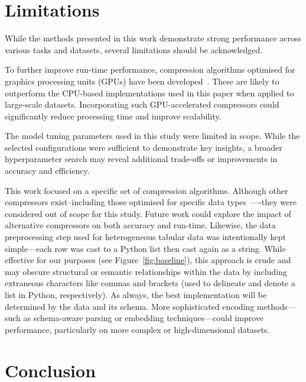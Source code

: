 \documentclass[preprint,12pt]{article}
\begin{document}
\section{Limitations}
\label{limitations}
While the methods presented in this work demonstrate strong performance across various tasks and datasets, several limitations should be acknowledged.

To further improve run-time performance, compression algorithms optimised for graphics processing units (GPUs) have been developed~\cite{gpu_compression}. 
These are likely to outperform the CPU-based implementations used in this paper when applied to large-scale datasets. 
Incorporating such GPU-accelerated compressors could significantly reduce processing time and improve scalability.

The model tuning parameters used in this study were limited in scope. 
While the selected configurations were sufficient to demonstrate key insights, a broader hyperparameter search may reveal additional trade-offs or improvements in accuracy and efficiency.

This work focused on a specific set of compression algorithms. 
Although other compressors exist--including those optimised for specific data types~\cite{gpu_compression,mp3,hevc}—-they were considered out of scope for this study. 
Future work could explore the impact of alternative compressors on both accuracy and run-time.
Likewise, the data preprocessing step used for heterogeneous tabular data was intentionally kept simple---each row was cast to a Python list then cast again as a string. 
While effective for our purposes (see Figure~\ref{fig:baseline}), this approach is crude and may obscure structural or semantic relationships within the data by including extraneous characters like commas and brackets (used to delineate and denote a list in Python, respectively).
As always, the best implementation will be determined by the data and its schema. 
More sophisticated encoding methods—such as schema-aware parsing or embedding techniques—could improve performance, particularly on more complex or high-dimensional datasets.




\section{Conclusion}
\label{conclusion}
\end{document}
